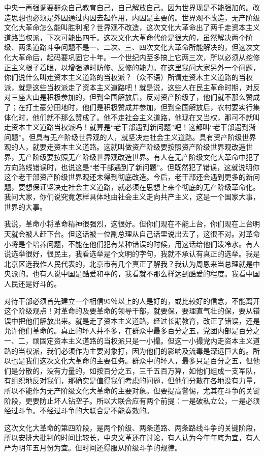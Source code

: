 中央一再强调要群众自己教育自己，自己解放自己。因为世界现是不能强加的。改造思想也必须是外因通过内因去起作用，内因是主要的。世界观不改造，无产阶级文化大革命怎么能叫胜利呢？世界观不改造，这次文化大革命出了两千走资本主义道路当权派，下次可能出四千。这次文化大革命代价是很大的，虽然解决两个阶级、两条道路斗争问题不是一、二次、三、四次文化大革命所能解决的，但这次文化大革命后，起码要巩固它十年。一个世纪内至多搞上它两三次，所以必须从挖修正主义根子着眼，以增强随时防修、反修的能力。在这里我问大家另外一个问题，你们说什么叫走资本主义道路的当权派？（众不语）所谓走资木主义道路的当权派，就是这些当权派走了资本主义道路吧！就是说，这些人在民主革命时期，对反对三座大山是积极参加的，但到全国解放后，反对资产阶级了，他们就不那么赞成了；在打土豪分田地时，他们是积极赞成并参加，但到全国解放后，农村要实行集体化时，他们就不那么赞成了。他不走社会主义道路，他现在又当权，那可不就叫走资本主义道路当权派吗！就算是“老干部遇到新问题”吧！这都叫“老干部遇到渐问题”。但具有无产阶级世界观的人，就坚决走社会主义道路。具有资产阶级世界观的人，就要走资本主义道路。这就叫做资产阶级要按照资产阶级世界观改造世界，无产阶级要按照无产阶级世界观改造世界。有人在无产阶级文化大革命中犯了方向路线错误时，也说这是“老干部遇到了新问题”。但既然犯了错误，这就说明你这个老干部资产阶级世界观还未得到彻底改造。今后，老干部还会遇到更多的新问题，要想保证坚决走社会主义道路，就必须在思想上来个彻底的无产阶级革命化。我问大家，你们说究竟怎样具体地由社会主义走向共产主义，这是一个国家大事，世界的大事。

我说，革命小将革命精神很强烈，这很好。但你们现在不能上台，你们现在上台明天就会被人赶下台。但这话被一位副总理从自己话里说出去了，这很不对。对革命小将是个培养问题，不能在他们犯有某种错误的时候，用这话给他们泼冷水。有人说选举很好，很民主，我看选举是个文明的字句，我就不承认有真正的选举。我是北京区选我作人民代表的，北京市有几个真正了解我？我认为周恩来当总理就是中央派的。也有人说中国是酷爱和平的，我看就不那么样达到酷爱的程度。我看中国人民还是好斗的。

对待干部必须首先建立一个相信95％以上的人是好的，或比较好的信念，不能离开这个阶级观点！对革命的及要革命的领导干部，就要保，要理直气壮的保，要从错误中把他们解放出来。就是走了资本主义道路，经过长期教育，改正了错误，还是允许他们革命的。真正的坏人并不多，在群众中最多百分之五，党团内部是百分之一、二，顽固定资本主义道路的当权派只是一小撮。但这一小撮党内走资本主义道路的当权派，我们必须作为主要对象打，因为他们的影响及流毒是深远巨大的。所以也是我们这次文化大革命的主要任务。群众中的坏人，最多只是百分之五，但他们是分散的，没有力量的，如按百分之五，三千五百万算，如他们组成一支军队，有组织地反对我们，那确实是值得我们考虑的问题，但他们分散在各地没有力量，所以不能作为无产阶级文化大革命的主要对象。但要提高警惕，尤其在斗争的关键阶段，更要防止坏人钻空子。所以大联合应有两个前提：一是破私立公，一是必须经过斗争。不经过斗争的大联合是不能奏效的。

这次文化大革命的第四阶段，是两个阶级、两条道路、两条路线斗争的关键阶段，所以安排大批判的时间比较长，中央文革还在讨论，有人认为今年年底为宜，有人严为明年五月份为宜。但时间还得服从阶级斗争的规律。


